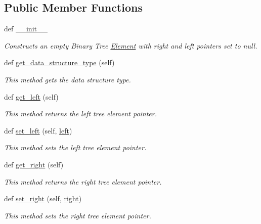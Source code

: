 \subsection*{Public Member Functions}
\begin{DoxyCompactItemize}
\item 
def \hyperlink{class_bin_tree_element_1_1_bin_tree_element_a76b206a9b2838d59601f3b88d70e966c}{\+\_\+\+\_\+init\+\_\+\+\_\+}
\begin{DoxyCompactList}\small\item\em Constructs an empty Binary Tree \hyperlink{namespace_element}{Element} with right and left pointers set to null. \end{DoxyCompactList}\item 
def \hyperlink{class_bin_tree_element_1_1_bin_tree_element_a5fbed10c27a4af273b0cb3a62b5b8dd1}{get\+\_\+data\+\_\+structure\+\_\+type} (self)
\begin{DoxyCompactList}\small\item\em This method gets the data structure type. \end{DoxyCompactList}\item 
def \hyperlink{class_bin_tree_element_1_1_bin_tree_element_af337b1219b2a593bc9cf6fb9dc2c9ba6}{get\+\_\+left} (self)
\begin{DoxyCompactList}\small\item\em This method returns the left tree element pointer. \end{DoxyCompactList}\item 
def \hyperlink{class_bin_tree_element_1_1_bin_tree_element_a98884037ad41c9f79ab52929199a029b}{set\+\_\+left} (self, \hyperlink{class_bin_tree_element_1_1_bin_tree_element_aa757940232835711bd16b58e67eae9fb}{left})
\begin{DoxyCompactList}\small\item\em This method sets the left tree element pointer. \end{DoxyCompactList}\item 
def \hyperlink{class_bin_tree_element_1_1_bin_tree_element_aa19ada78d5e890a4dec1f0ec255a7a55}{get\+\_\+right} (self)
\begin{DoxyCompactList}\small\item\em This method returns the right tree element pointer. \end{DoxyCompactList}\item 
def \hyperlink{class_bin_tree_element_1_1_bin_tree_element_a71de58952115ba4b7b8fadac3e6750be}{set\+\_\+right} (self, \hyperlink{class_bin_tree_element_1_1_bin_tree_element_a96aa549e65f62466b8637ad16f1c2292}{right})
\begin{DoxyCompactList}\small\item\em This method sets the right tree element pointer. \end{DoxyCompactList}\end{DoxyCompactItemize}
